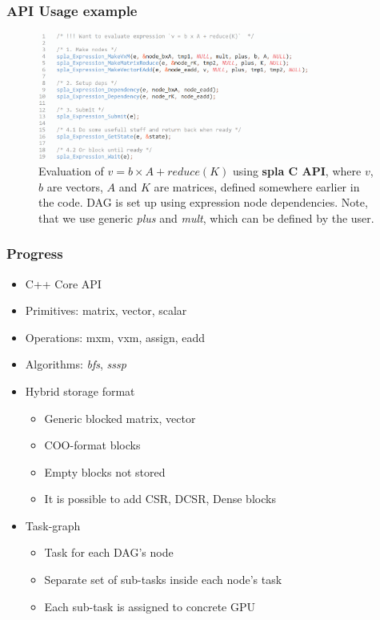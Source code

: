 \documentclass[aspectratio=169,xcolor=table,english]{beamer}
\begin{document}
\begin{frame}[fragile] \frametitle{API Usage example}
    \begin{center}
    \begin{minipage}[m]{0.9\linewidth}
        \begin{figure}
            \centering
            \includegraphics[width=0.8\textwidth]{figures/c_api_expression.png}
            \caption{Evaluation of $v = b \times A + \textit{reduce}(K)$ using \textbf{spla C API}, where $v$, $b$ are vectors, $A$ and $K$ are matrices, defined somewhere earlier in the code. DAG is set up using expression node dependencies. Note, that we use generic \textit{plus} and \textit{mult}, which can be defined by the user.}
        \end{figure}
    \end{minipage}\hfill   
    \end{center}
\end{frame}

\begin{frame}[fragile] \frametitle{Progress}
    \begin{itemize}
        \item C++ Core API
        \item Primitives: matrix, vector, scalar
        \item Operations: mxm, vxm, assign, eadd
        \item Algorithms: \textit{bfs}, \textit{sssp}
        \item Hybrid storage format
        {
        \begin{itemize}
            \item Generic blocked matrix, vector
            \item COO-format blocks 
            \item Empty blocks not stored
            \item It is possible to add CSR, DCSR, Dense blocks
        \end{itemize}
        }
        \item Task-graph
        {
        \begin{itemize}
            \item Task for each DAG's node
            \item Separate set of sub-tasks inside each node's task
            \item Each sub-task is assigned to concrete GPU
        \end{itemize}
        }
    \end{itemize}
\end{frame}
\end{document}
